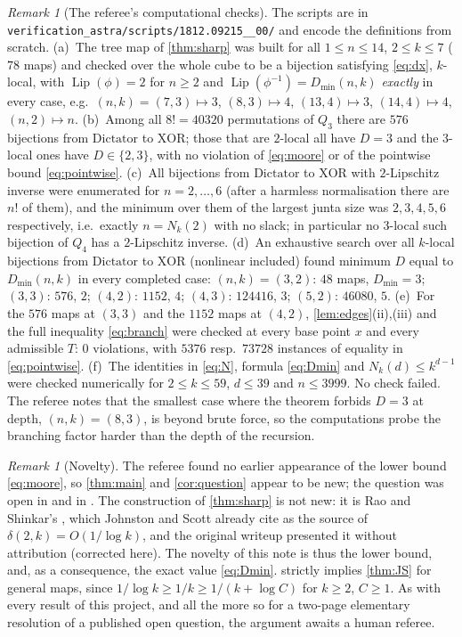 \documentclass[11pt,a4paper]{article}
\theoremstyle{plain}
\theoremstyle{definition}
\theoremstyle{remark}
\newtheorem{remark}[theorem]{Remark}
\newcommand{\Lip}{\operatorname{Lip}}
\newcommand{\Dict}{\mathrm{Dictator}}
\newcommand{\XOR}{\mathrm{XOR}}
\begin{document}
\begin{remark}[The referee's computational checks]
The scripts are in \nolinkurl{verification_astra/scripts/1812.09215__00/} and encode the definitions from scratch. (a)~The tree map of \cref{thm:sharp} was built for all $1\le n\le14$, $2\le k\le7$ ($78$ maps) and checked over the whole cube to be a bijection satisfying \eqref{eq:dx}, $k$-local, with $\Lip(\phi)=2$ for $n\ge2$ and $\Lip(\phi^{-1})=D_{\min}(n,k)$ \emph{exactly} in every case, e.g.\ $(n,k)=(7,3)\mapsto3$, $(8,3)\mapsto4$, $(13,4)\mapsto3$, $(14,4)\mapsto4$, $(n,2)\mapsto n$. (b)~Among all $8!=40320$ permutations of $Q_3$ there are $576$ bijections from $\Dict$ to $\XOR$; those that are $2$-local all have $D=3$ and the $3$-local ones have $D\in\{2,3\}$, with no violation of \eqref{eq:moore} or of the pointwise bound \eqref{eq:pointwise}. (c)~All bijections from $\Dict$ to $\XOR$ with $2$-Lipschitz inverse were enumerated for $n=2,\dots,6$ (after a harmless normalisation there are $n!$ of them), and the minimum over them of the largest junta size was $2,3,4,5,6$ respectively, i.e.\ exactly $n=N_k(2)$ with no slack; in particular no $3$-local such bijection of $Q_4$ has a $2$-Lipschitz inverse. (d)~An exhaustive search over all $k$-local bijections from $\Dict$ to $\XOR$ (nonlinear included) found minimum $D$ equal to $D_{\min}(n,k)$ in every completed case: $(n,k)=(3,2)$: $48$ maps, $D_{\min}=3$; $(3,3)$: $576$, $2$; $(4,2)$: $1152$, $4$; $(4,3)$: $124416$, $3$; $(5,2)$: $46080$, $5$. (e)~For the $576$ maps at $(3,3)$ and the $1152$ maps at $(4,2)$, \cref{lem:edges}(ii),(iii) and the full inequality \eqref{eq:branch} were checked at every base point $x$ and every admissible $T$: $0$ violations, with $5376$ resp.\ $73728$ instances of equality in \eqref{eq:pointwise}. (f)~The identities in \eqref{eq:N}, formula \eqref{eq:Dmin} and $N_k(d)\le k^{d-1}$ were checked numerically for $2\le k\le59$, $d\le39$ and $n\le3999$. No check failed. The referee notes that the smallest case where the theorem forbids $D=3$ at depth, $(n,k)=(8,3)$, is beyond brute force, so the computations probe the branching factor harder than the depth of the recursion.
\end{remark}

\begin{remark}[Novelty]
The referee found no earlier appearance of the lower bound \eqref{eq:moore}, so \cref{thm:main} and \cref{cor:question} appear to be new; the question was open in \cite{JS21} and in \cite{Joh21}. The construction of \cref{thm:sharp} is not new: it is Rao and Shinkar's \cite[Theorem~2 and Appendix~A]{RS18}, which Johnston and Scott already cite as the source of $\delta(2,k)=O(1/\log k)$, and the original writeup presented it without attribution (corrected here). The novelty of this note is thus the lower bound, and, as a consequence, the exact value \eqref{eq:Dmin}.  strictly implies \cref{thm:JS} for general maps, since $1/\log k\ge1/k\ge1/(k+\log C)$ for $k\ge2$, $C\ge1$. As with every result of this project, and all the more so for a two-page elementary resolution of a published open question, the argument awaits a human referee.
\end{remark}
\end{document}
